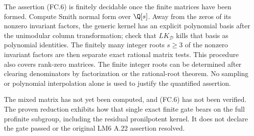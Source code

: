 The assertion (FC.6) is finitely decidable
once the finite matrices have been formed.
Compute Smith normal form over $\Q[s]$.
Away from the zeros of its nonzero invariant
factors, the generic kernel has an explicit
polynomial basis after the unimodular
column transformation; check that
$LK_{\mathcal D}$ kills that basis as
polynomial identities. The finitely many
integer roots $s\geq3$ of the nonzero
invariant factors are then separate exact
rational matrix tests. This procedure also
covers rank-zero matrices. The finite
integer roots can be determined after
clearing denominators by factorization or
the rational-root theorem. No sampling
or polynomial interpolation alone is
used to justify the quantified assertion.

The mixed matrix has not yet been
computed, and (FC.6) has not been verified.
The proven reduction exhibits how that
single exact finite gate bears on the
full profinite subgroup, including the
residual pronilpotent kernel. It does not
declare the gate passed or the original
LM6 A.22 assertion resolved.
